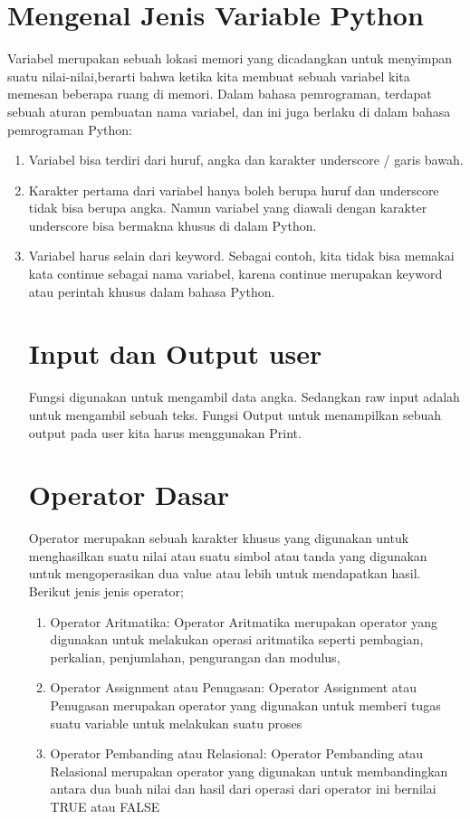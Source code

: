 \section{Mengenal Jenis Variable Python}
    Variabel merupakan sebuah lokasi memori yang dicadangkan untuk menyimpan suatu nilai-nilai,berarti bahwa ketika kita membuat sebuah variabel kita memesan beberapa ruang di memori. 
    Dalam bahasa pemrograman, terdapat sebuah aturan pembuatan nama variabel, dan ini juga berlaku di dalam bahasa pemrograman Python:
    \begin{enumerate}
    \item  Variabel bisa terdiri dari huruf, angka dan karakter underscore / garis bawah.
    \item  Karakter pertama dari variabel hanya boleh berupa huruf dan underscore tidak bisa berupa angka. Namun variabel yang diawali dengan karakter underscore bisa bermakna khusus di dalam Python.
    \item Variabel harus selain dari keyword. Sebagai contoh, kita tidak bisa memakai kata continue sebagai nama variabel, karena continue merupakan keyword atau perintah khusus dalam bahasa Python.
\section{Input dan Output user}
    Fungsi digunakan untuk mengambil data angka. Sedangkan raw input adalah untuk mengambil sebuah teks.
    Fungsi Output untuk menampilkan sebuah output pada user kita harus menggunakan Print.
\section{Operator Dasar}
    Operator merupakan sebuah karakter khusus yang digunakan untuk menghasilkan suatu nilai atau suatu simbol atau tanda yang digunakan untuk mengoperasikan dua value atau lebih untuk mendapatkan hasil.
    Berikut jenis jenis operator;
    \begin{enumerate}
    \item  Operator Aritmatika:
    Operator Aritmatika merupakan operator yang digunakan untuk melakukan operasi aritmatika seperti pembagian, perkalian, penjumlahan, pengurangan dan modulus,
    \item  Operator Assignment atau Penugasan: 
    Operator Assignment atau Penugasan merupakan operator yang digunakan untuk memberi tugas suatu variable untuk melakukan suatu proses
    \item Operator Pembanding atau Relasional: 
    Operator Pembanding atau Relasional merupakan operator yang digunakan untuk membandingkan antara dua buah nilai dan hasil dari operasi dari operator ini
    bernilai TRUE atau FALSE

\end{enumerate}
\end{enumerate}
